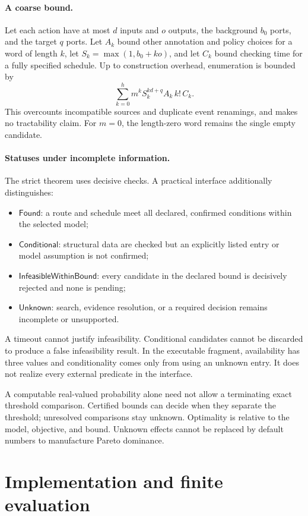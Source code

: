 \documentclass[11pt,a4paper]{article}
\theoremstyle{remark}
\newcommand{\Unknown}{\mathsf{Unknown}}
\newcommand{\Found}{\mathsf{Found}}
\newcommand{\Conditional}{\mathsf{Conditional}}
\newcommand{\Infeasible}{\mathsf{InfeasibleWithinBound}}
\begin{document}
\paragraph{A coarse bound.}
Let each action have at most \(d\) inputs and \(o\) outputs, the background
\(b_0\) ports, and the target \(q\) ports. Let \(A_k\) bound other annotation
and policy choices for a word of length \(k\), let \(S_k=\max(1,b_0+ko)\), and
let \(C_k\) bound checking time for a fully specified schedule. Up to construction
overhead, enumeration is bounded by
\[
 \sum_{k=0}^h m^k S_k^{kd+q} A_k\, k!\, C_k .
\]
This overcounts incompatible sources and duplicate event renamings, and
makes no tractability claim. For \(m=0\), the length-zero word remains the
single empty candidate.

\paragraph{Statuses under incomplete information.}
The strict theorem uses decisive checks. A practical interface additionally
distinguishes:
\begin{itemize}
\item \(\Found\): a route and schedule meet all declared, confirmed conditions
within the selected model;
\item \(\Conditional\): structural data are checked but an explicitly listed
entry or model assumption is not confirmed;
\item \(\Infeasible\): every candidate in the declared bound is decisively
rejected and none is pending;
\item \(\Unknown\): search, evidence resolution, or a required decision remains
incomplete or unsupported.
\end{itemize}
A timeout cannot justify infeasibility. Conditional candidates cannot be
discarded to produce a false infeasibility result. In the executable fragment,
availability has three values and conditionality comes only from using an
unknown entry. It does not realize every external predicate in the interface.

A computable real-valued probability alone need not allow a terminating exact
threshold comparison. Certified bounds can decide when they separate the
threshold; unresolved comparisons stay unknown. Optimality is relative to the
model, objective, and bound. Unknown effects cannot be replaced by default
numbers to manufacture Pareto dominance.

\section{Implementation and finite evaluation}\label{sec:evaluation}
\end{document}

